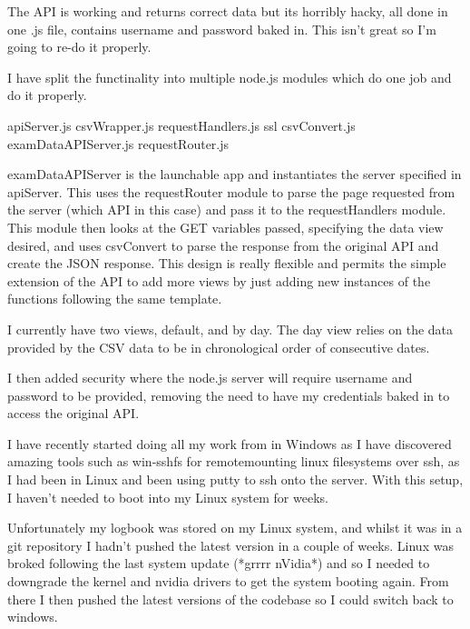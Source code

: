 \documentclass[idxtotoc,hyperref,openany]{labbook} %
\begin{document}


 The API is working and returns correct data but its horribly hacky, all done in one .js file, contains username and password baked in.  This isn't great so I'm going to re-do it properly.

 I have split the functinality into multiple node.js modules which do one job and do it properly.

apiServer.js
csvWrapper.js
requestHandlers.js
ssl
csvConvert.js
examDataAPIServer.js
requestRouter.js

examDataAPIServer is the launchable app and instantiates the server specified in apiServer.  This uses the requestRouter module to parse the page requested from the server (which API in this case) and pass it to the requestHandlers module.  This module then looks at the GET variables passed, specifying the data view desired, and uses csvConvert to parse the response from the original API and create the JSON response.  This design is really flexible and permits the simple extension of the API to add more views by just adding new instances of the functions following the same template.

I currently have two views, default, and by day.  The day view relies on the data provided by the CSV data to be in chronological order of consecutive dates.

I then added security where the node.js server will require username and password to be provided, removing the need to have my credentials baked in to access the original API.  



I have recently started doing all my work from in Windows as I have discovered amazing tools such as win-sshfs for remotemounting linux filesystems over ssh, as I had been in Linux and been using putty to ssh onto the server.  With this setup, I haven't needed to boot into my Linux system for weeks.

Unfortunately my logbook was stored on my Linux system, and whilst it was in a git repository I hadn't pushed the latest version in a couple of weeks.  Linux was broked following the last system update (*grrrr nVidia*) and so I needed to downgrade the kernel and nvidia drivers to get the system booting again.  From there I then pushed the latest versions of the codebase so I could switch back to windows.
\end{document}

